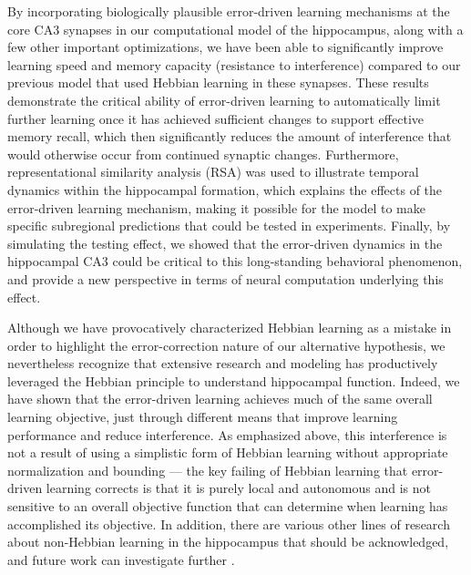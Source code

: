 \documentclass[11pt,twoside]{article}
\newif\myifpdf
\begin{document}
By incorporating biologically plausible error-driven learning mechanisms at the core CA3 synapses in our computational model of the hippocampus, along with a few other important optimizations, we have been able to significantly improve learning speed and memory capacity (resistance to interference) compared to our previous model that used Hebbian learning in these synapses. These results demonstrate the critical ability of error-driven learning to automatically limit further learning once it has achieved sufficient changes to support effective memory recall, which then significantly reduces the amount of interference that would otherwise occur from continued synaptic changes.  Furthermore, representational similarity analysis (RSA) was used to illustrate temporal dynamics within the hippocampal formation, which explains the effects of the error-driven learning mechanism, making it possible for the model to make specific subregional predictions that could be tested in experiments.  Finally, by simulating the testing effect, we showed that the error-driven dynamics in the hippocampal CA3 could be critical to this long-standing behavioral phenomenon, and provide a new perspective in terms of neural computation underlying this effect.

Although we have provocatively characterized Hebbian learning as a mistake in order to highlight the error-correction nature of our alternative hypothesis, we nevertheless recognize that extensive research and modeling has productively leveraged the Hebbian principle to understand hippocampal function.  Indeed, we have shown that the error-driven learning achieves much of the same overall learning objective, just through different means that improve learning performance and reduce interference.  As emphasized above, this interference is not a result of using a simplistic form of Hebbian learning without appropriate normalization and bounding --- the key failing of Hebbian learning that error-driven learning corrects is that it is purely local and autonomous and is not sensitive to an overall objective function that can determine when learning has accomplished its objective.  In addition, there are various other lines of research about non-Hebbian learning in the hippocampus that should be acknowledged, and future work can investigate further \citep{RebolaCartaMulle17,Jackson20,PandaRoy17,ChistiakovaBannonBazhenovEtAl14,TsukamotoYasuiYamadaEtAl03}.
\end{document}
